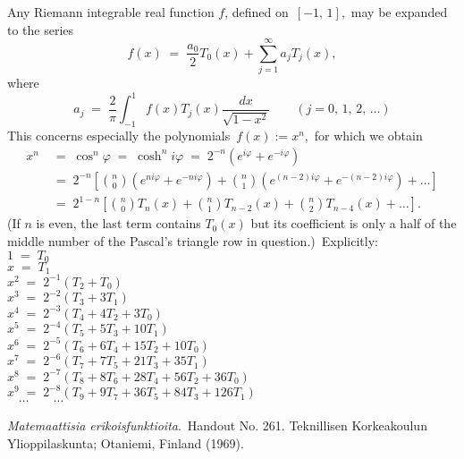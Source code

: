 \documentclass[12pt]{article}
\theoremstyle{definition}
\begin{document}
Any Riemann integrable real function $f$, defined on\, $[-1,\,1]$,\, may be expanded to the series
$$f(x) \;=\; \frac{a_0}{2}T_0(x)+\sum_{j=1}^\infty a_jT_j(x),$$
where
$$a_j \;=\; \frac{2}{\pi}\int_{-1}^1\!f(x)T_j(x)\frac{dx}{\sqrt{1\!-\!x^2}} \qquad (j = 0,\,1,\,2,\,\ldots)$$
This concerns especially the polynomials \,$f(x) := x^n$,\, for which we obtain
\begin{align*}
x^n & \;=\; \cos^n\varphi \;=\; \cosh^n{i\varphi} \;=\; 2^{-n}(e^{i\varphi}+e^{-i\varphi})\\
    & \;=\;
2^{-n}\left[{n\choose0}(e^{ni\varphi}+e^{-ni\varphi})+{n\choose1}(e^{(n-2)i\varphi}+e^{-(n-2)i\varphi})+\ldots\right]\\
    & \;=\;
2^{1-n}\left[{n\choose0}T_{n}(x)+{n\choose1}T_{n-2}(x)+{n\choose2}T_{n-4}(x)+\ldots\right]\!.
\end{align*}
(If $n$ is even, the last term contains $T_0(x)$ but its coefficient is only a half of the middle number of the Pascal's triangle row in question.)\, Explicitly:\\

$1  \;=\; T_0$\\
$x  \;=\; T_1$\\
$x^2 \;=\; 2^{-1}(T_2+T_0)$\\
$x^3 \;=\; 2^{-2}(T_3+3T_1)$\\
$x^4 \;=\; 2^{-3}(T_4+4T_2+3T_0)$\\
$x^5 \;=\; 2^{-4}(T_5+5T_3+10T_1)$\\
$x^6 \;=\; 2^{-5}(T_6+6T_4+15T_2+10T_0)$\\
$x^7 \;=\; 2^{-6}(T_7+7T_5+21T_3+35T_1)$\\
$x^8 \;=\; 2^{-7}(T_8+8T_6+28T_4+56T_2+36T_0)$\\
$x^9 \;=\; 2^{-8}(T_9+9T_7+36T_5+84T_3+126T_1)$\\
$\mbox{  }\; \cdots \qquad \cdots$

\begin{thebibliography}{9}
 {\em Matemaattisia erikoisfunktioita}.\, Handout No. 261. Teknillisen Korkeakoulun Ylioppilaskunta; Otaniemi, Finland (1969).
\end{thebibliography}


\end{document}
